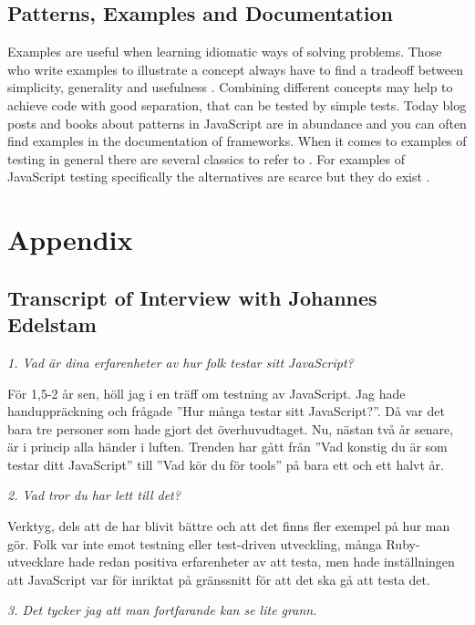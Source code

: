 \documentclass[11pt]{article}
\begin{document}
\subsection{Patterns, Examples and Documentation}

Examples are useful when learning idiomatic ways of solving problems. Those who write examples to illustrate a concept always have to find a tradeoff between simplicity, generality and usefulness \cite[questions~56-57]{Edelstam}. Combining different concepts may help to achieve code with good separation, that can be tested by simple tests. Today blog posts and books about patterns in JavaScript are in abundance and you can often find examples in the documentation of frameworks. When it comes to examples of testing in general there are several classics to refer to \cite{KentBeck}\cite{TestPatterns}. For examples of JavaScript testing specifically the alternatives are scarce but they do exist \cite{Tddjs}\cite{BDDJS}\cite{TestableJS}.

\printbibliography[heading=bibnumbered]

\section{Appendix}

\subsection{Transcript of Interview with Johannes Edelstam}

\emph{1. Vad är dina erfarenheter av hur folk testar sitt JavaScript?}

För 1,5-2 år sen, höll jag i en träff om testning av JavaScript. Jag hade handuppräckning och frågade ”Hur många testar sitt JavaScript?”. Då var det bara tre personer som hade gjort det överhuvudtaget. Nu, nästan två år senare, är i princip alla händer i luften. Trenden har gått från ”Vad konstig du är som testar ditt JavaScript” till ”Vad kör du för tools” på bara ett och ett halvt år.

\emph{2. Vad tror du har lett till det?}

Verktyg, dels att de har blivit bättre och att det finns fler exempel på hur man gör. Folk var inte emot testning eller test-driven utveckling, många Ruby-utvecklare hade redan positiva erfarenheter av att testa, men hade inställningen att JavaScript var för inriktat på gränssnitt för att det ska gå att testa det.

\emph{3. Det tycker jag att man fortfarande kan se lite grann.}
\end{document}
